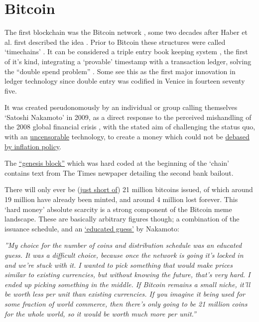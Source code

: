 \section{Bitcoin}
The first blockchain was the Bitcoin network \cite{Nakamoto2008}, some two decades after Haber et al. first described the idea \cite{haber1990time}. Prior to Bitcoin these structures were called `timechains' \cite{nakamoto2018}. It can be considered a triple entry book keeping system \cite{ijiri1986framework, faccia2019accounting}, the first of it's kind, integrating a `provable' timestamp with a transaction ledger, solving the ``double spend problem'' \cite{chohan2021double, perez2019double}. Some see this as the first major innovation in ledger technology since double entry was codified in Venice in fourteen seventy five\cite{sangster2015earliest}. \par
It was created pseudonomously by an individual or group calling themselves `Satoshi Nakamoto' in 2009, as a direct response to the perceived mishandling of the 2008 global financial crisis \cite{nakamoto2018}, with the stated aim of challenging the status quo, with an \href{https://world.hey.com/dhh/i-was-wrong-we-need-crypto-587ccb03}{uncensorable} technology, to create a money which could not be \href{http://p2pfoundation.ning.com/forum/topics/bitcoin-open-source}{debased by inflation policy}. \par
The \href{https://en.bitcoin.it/wiki/Genesis_block}{``genesis block''} which was hard coded at the beginning of the `chain' contains text from The Times newpaper detailing the second bank bailout.\par 
There will only ever be (\href{https://blog.amberdata.io/why-the-bitcoin-supply-will-never-reach-21-million}{just short of}) 21 million bitcoins issued, of which around 19 million have already been minted, and around 4 million lost forever. This `hard money' absolute scarcity is a strong component of the Bitcoin meme landscape. These are basically arbitrary figures though; a combination of the issuance schedule, and an \href{https://plan99.net/~mike/satoshi-emails/thread1.html}{`educated guess'} by Nakamoto: \cite{nakamoto2018}\par 
\textit{''My choice for the number of coins and distribution schedule was an educated guess.  It was a difficult choice, because once the network is going it's locked in and we're stuck with it.  I wanted to pick something that would make prices similar to existing currencies, but without knowing the future, that's very hard.  I ended up picking something in the middle.  If Bitcoin remains a small niche, it'll be worth less per unit than existing currencies.  If you imagine it being used for some fraction of world commerce, then there's only going to be 21 million coins for the whole world, so it would be worth much more per unit.''}\par
